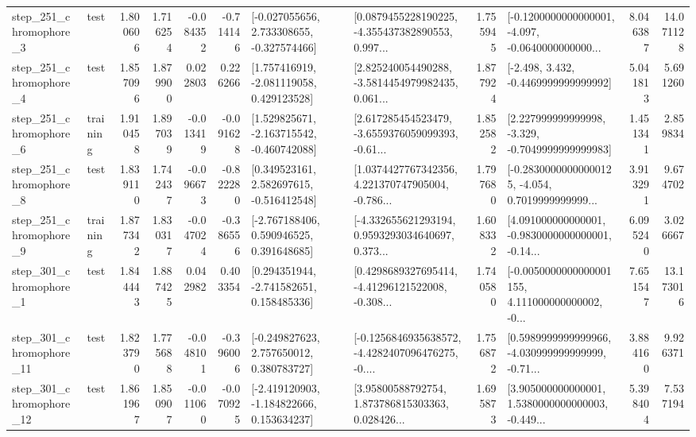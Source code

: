 \begin{tabular}{llrrrrllrlrr}
   step\_251\_chromophore\_3 &      test &      1.800606 &    1.716254 &     -0.084352 & -0.714146 &   [-0.027055656, 2.733308655, -0.327574466] &  [0.0879455228190225, -4.355437382890553, 0.997... &       1.755945 &  [-0.1200000000000001, -4.097, -0.0640000000000... &            8.046387 &         14.071128 \\
   step\_251\_chromophore\_4 &      test &      1.857096 &    1.879900 &      0.022803 &  0.226266 &    [1.757416919, -2.081119058, 0.429123528] &  [2.825240054490288, -3.5814454979982435, 0.061... &       1.877924 &               [-2.498, 3.432, -0.4469999999999992] &            5.041813 &          5.691260 \\
   step\_251\_chromophore\_6 &  training &      1.910458 &    1.897039 &     -0.013419 & -0.091628 &   [1.529825671, -2.163715542, -0.460742088] &  [2.617285454523479, -3.6559376059099393, -0.61... &       1.852582 &   [2.227999999999998, -3.329, -0.7049999999999983] &            1.451341 &          2.859834 \\
   step\_251\_chromophore\_8 &      test &      1.839110 &    1.742437 &     -0.096673 & -0.822280 &    [0.349523161, 2.582697615, -0.516412548] &  [1.0374427767342356, 4.221370747905004, -0.786... &       1.797680 &  [-0.28300000000000125, -4.054, 0.7019999999999... &            3.913291 &          9.674702 \\
   step\_251\_chromophore\_9 &  training &      1.877342 &    1.830317 &     -0.047024 & -0.386556 &    [-2.767188406, 0.590946525, 0.391648685] &  [-4.332655621293194, 0.9593293034640697, 0.373... &       1.608332 &  [4.091000000000001, -0.9830000000000001, -0.14... &            6.095240 &          3.026667 \\
   step\_301\_chromophore\_1 &      test &      1.844443 &    1.887425 &      0.042982 &  0.403354 &    [0.294351944, -2.741582651, 0.158485336] &  [0.4298689327695414, -4.41296121522008, -0.308... &       1.740580 &  [-0.0050000000000001155, 4.111000000000002, -0... &            7.651547 &         13.173016 \\
  step\_301\_chromophore\_11 &      test &      1.823790 &    1.775688 &     -0.048101 & -0.396006 &    [-0.249827623, 2.757650012, 0.380783727] &  [-0.1256846935638572, -4.4282407096476275, -0.... &       1.756872 &  [0.5989999999999966, -4.030999999999999, -0.71... &            3.884160 &          9.926371 \\
  step\_301\_chromophore\_12 &      test &      1.861967 &    1.850907 &     -0.011060 & -0.070925 &   [-2.419120903, -1.184822666, 0.153634237] &  [3.95800588792754, 1.873786815303363, 0.028426... &       1.695873 &  [3.905000000000001, 1.5380000000000003, -0.449... &            5.398404 &          7.537194 \\

\end{tabular}
